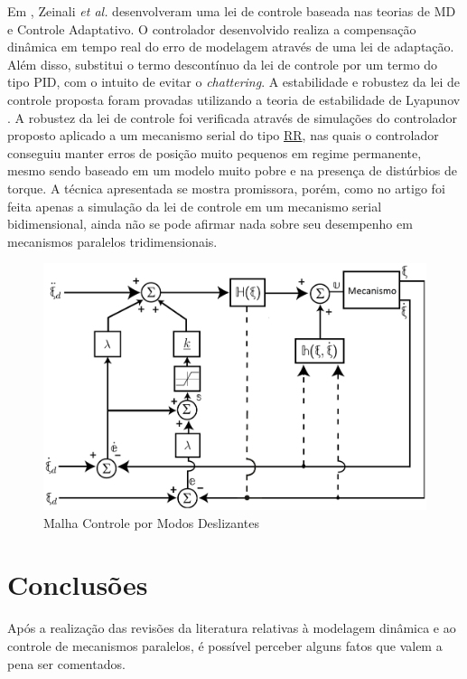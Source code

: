 \documentclass[]{politex}
\begin{document}
Em \cite{Zeinali}, Zeinali \emph{et al.} desenvolveram uma lei de controle  baseada nas teorias de MD e Controle Adaptativo. O controlador desenvolvido realiza a compensação dinâmica em tempo real do erro de modelagem através de uma lei de adaptação. Além disso, substitui o termo descontínuo da lei de controle por um termo do tipo PID, com o intuito de evitar o {\em chattering}. A estabilidade e robustez da lei de controle proposta foram provadas utilizando a teoria de estabilidade de Lyapunov \cite{Slotini}. A robustez da lei de controle foi verificada através de simulações do controlador proposto aplicado a um mecanismo serial do tipo \underline{R}\underline{R}, nas quais o controlador conseguiu manter erros de posição muito pequenos em regime permanente, mesmo sendo baseado em um modelo muito pobre e na presença de distúrbios de torque. A técnica apresentada se mostra promissora, porém, como no artigo foi feita apenas a simulação da lei de controle em um mecanismo serial bidimensional, ainda não se pode afirmar nada sobre seu desempenho em mecanismos paralelos tridimensionais.

\begin{figure}[h]
	\centering
	\includegraphics[scale=0.55]{../figures/CMDnew.jpg}  
	\caption{Malha Controle por Modos Deslizantes}
	\label{fig:CMD}
\end{figure}

\section{Conclusões}

Após a realização das revisões da literatura relativas à modelagem dinâmica e ao controle de mecanismos paralelos, é possível perceber alguns fatos que valem a pena ser comentados.
\end{document}
